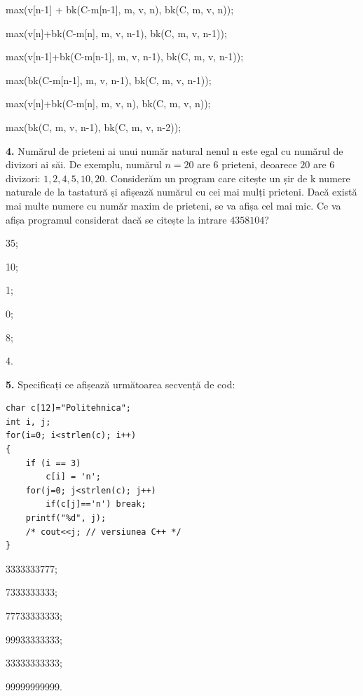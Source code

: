 \documentclass[11pt, a4paper]{article}
\begin{document}
\begin{inparaenum}
    \item max(v[n-1] + bk(C-m[n-1], m, v, n), bk(C, m, v, n));
    \item max(v[n]+bk(C-m[n], m, v, n-1), bk(C, m, v, n-1));
    \item max(v[n-1]+bk(C-m[n-1], m, v, n-1), bk(C, m, v, n-1));
    \item max(bk(C-m[n-1], m, v, n-1), bk(C, m, v, n-1));
    \item max(v[n]+bk(C-m[n], m, v, n), bk(C, m, v, n));
    \item max(bk(C, m, v, n-1), bk(C, m, v, n-2));
\end{inparaenum}
\vspace{0.5cm}

\textbf{4.}\newline
Numărul de prieteni ai unui număr natural nenul n este egal cu numărul de divizori ai săi. De exemplu, numărul $n=20$ are 6 prieteni, deoarece $20$ are $6$ divizori: ${1,2,4,5,10,20}$. Considerăm un program care citește un șir de k numere naturale de la tastatură și afișează numărul cu cei mai mulți prieteni. Dacă există mai multe numere cu număr maxim de prieteni, se va afișa cel mai mic. Ce va afișa programul considerat dacă se citește la intrare $4 35 8 10 4$?
\begin{inparaenum}
    \item 35;
    \item 10;
    \item 1;
    \item 0;
    \item 8;
    \item 4.
\end{inparaenum}

\vspace{0.5cm}

\textbf{5.}\newline
Specificați ce afișează următoarea secvență de cod:
\begin{lstlisting}
char c[12]="Politehnica";
int i, j;
for(i=0; i<strlen(c); i++)
{
    if (i == 3)
        c[i] = 'n';
    for(j=0; j<strlen(c); j++)
        if(c[j]=='n') break;
    printf("%d", j);
    /* cout<<j; // versiunea C++ */
}
\end{lstlisting}
\begin{inparaenum}
    \item 3333333777;
    \item 7333333333;
    \item 77733333333;
    \item 99933333333;
    \item 33333333333;
    \item 99999999999.
\end{inparaenum}
\end{document}
